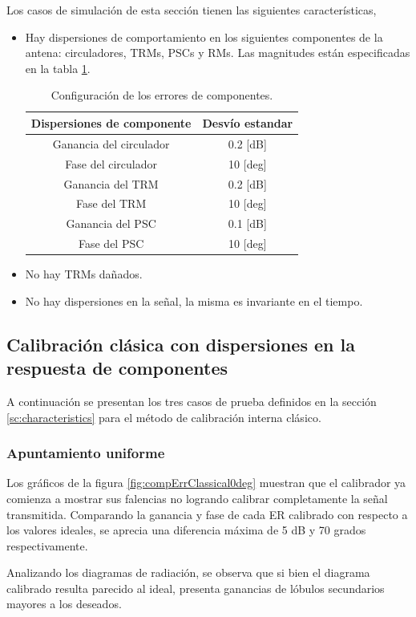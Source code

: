 Los casos de simulación de esta sección tienen las siguientes características,
\begin{itemize}
	\item Hay dispersiones de comportamiento en los siguientes componentes de la antena: circuladores, TRMs, PSCs y RMs. Las 
		magnitudes están especificadas en la tabla \ref{tab:errorReferences}.
		\begin{table}[H]
		  \footnotesize
		  \centering
		  \begin{tabular}{|c|c|}
			\hline
			\textbf{Dispersiones de componente} & \textbf{Desvío estandar} \tabularnewline \hline 
			Ganancia del circulador &  0.2 [dB] \tabularnewline\hline 
			Fase del circulador &  10 [deg] \tabularnewline\hline 
			Ganancia del TRM &  0.2 [dB] \tabularnewline\hline 
			Fase del TRM &  10 [deg] \tabularnewline\hline 
			Ganancia del PSC &  0.1 [dB] \tabularnewline\hline 
			Fase del PSC &  10 [deg] \tabularnewline\hline 
		  \end{tabular}
		  \caption{Configuración de los errores de componentes.}
		  \label{tab:errorReferences}
		\end{table}
	\item No hay TRMs dañados.
	\item No hay dispersiones en la señal, la misma es invariante en el tiempo.
\end{itemize}

\subsection{Calibración clásica con dispersiones en la respuesta de componentes}
\label{ssc:classicalDispersion}

A continuación se presentan los tres casos de prueba definidos en la sección \ref{sc:characteristics} para el método de
calibración interna clásico.


\subsubsection{Apuntamiento uniforme}

Los gráficos de la figura \ref{fig:compErrClassical0deg} muestran que el calibrador ya comienza a mostrar sus falencias no 
logrando calibrar completamente la señal transmitida. Comparando la ganancia y fase de cada ER calibrado con respecto a los
valores ideales, se aprecia una diferencia máxima de 5 dB y 70 grados respectivamente.

Analizando los diagramas de radiación, se observa que si bien el diagrama calibrado resulta parecido al ideal, presenta ganancias
de lóbulos secundarios mayores a los deseados.


